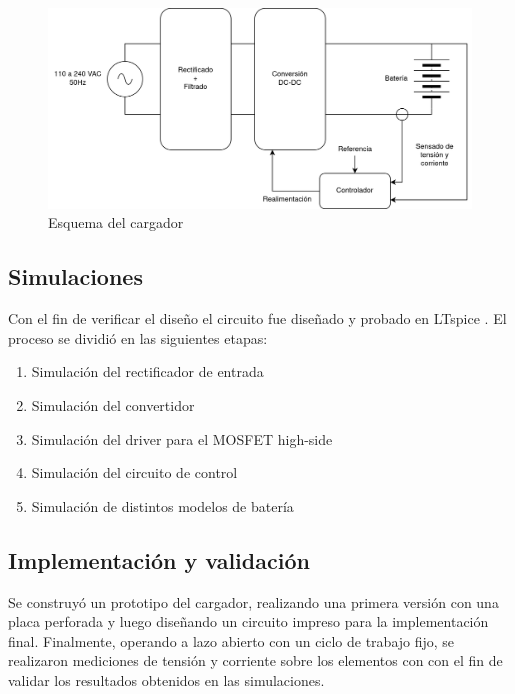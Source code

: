 \begin{figure}[H]
    \centering
    \includegraphics[width=\textwidth]{images/esquema_cargador_v2.png}
    \caption{Esquema del cargador}
    \label{fig:esquema_cargador}
\end{figure}

\subsection{Simulaciones}
Con el fin de verificar el diseño el circuito fue diseñado y probado en LTspice \cite{ltspice}.
El proceso se dividió en las siguientes etapas:
\begin{enumerate}
    \item Simulación del rectificador de entrada
    \item Simulación del convertidor
    \item Simulación del driver para el MOSFET high-side
    \item Simulación del circuito de control
    \item Simulación de distintos modelos de batería
\end{enumerate}

\subsection{Implementación y validación}
Se construyó un prototipo del cargador, realizando una primera versión con una placa perforada
y luego diseñando un circuito impreso para la implementación final.
Finalmente, operando a lazo abierto con un ciclo de trabajo fijo, se realizaron mediciones de tensión y corriente sobre los elementos con
con el fin de validar los resultados obtenidos en las simulaciones.